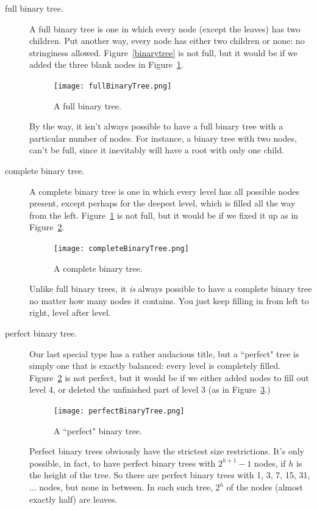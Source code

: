 \begin{description}
\item [full binary tree.] A full binary tree is one in which every node
(except the leaves) has two children. Put another way, every node has
either two children or none: no stringiness allowed.
Figure~\ref{binarytree} is not full, but it would be if we added the three
blank nodes in Figure~\ref{fullbinarytree}.

\begin{figure}[ht]
\centering
\texttt{[image: fullBinaryTree.png]}
\caption{A full binary tree.}
\label{fullbinarytree}
\end{figure}

By the way, it isn't always possible to have a full binary tree with a
particular number of nodes. For instance, a binary tree with two nodes,
can't be full, since it inevitably will have a root with only one child.

\item [complete binary tree.] A complete binary tree is one in which every
level has all possible nodes present, except perhaps for the deepest level,
which is filled all the way from the left. Figure~\ref{fullbinarytree} is
not full, but it would be if we fixed it up as in
Figure~\ref{completebinarytree}.

\begin{figure}[ht]
\centering
\texttt{[image: completeBinaryTree.png]}
\caption{A complete binary tree.}
\label{completebinarytree}
\end{figure}

Unlike full binary trees, it \textit{is} always possible to have a complete
binary tree no matter how many nodes it contains. You just keep filling in
from left to right, level after level.

\item [perfect binary tree.] Our last special type has a rather audacious
title, but a ``perfect" tree is simply one that is exactly balanced: every
level is completely filled. 
Figure~\ref{completebinarytree} is
not perfect, but it would be if we either added nodes to fill out level 4,
or deleted the unfinished part of level 3 (as in
Figure~\ref{perfectbinarytree}.)

\begin{figure}[ht]
\centering
\texttt{[image: perfectBinaryTree.png]}
\caption{A ``perfect" binary tree.}
\label{perfectbinarytree}
\end{figure}

Perfect binary trees obviously have the strictest size restrictions. It's
only possible, in fact, to have perfect binary trees with $2^{h+1}-1$
nodes, if $h$ is the height of the tree. So there are perfect binary trees
with 1, 3, 7, 15, 31, ... nodes, but none in between. In each such tree,
$2^h$ of the nodes (almost exactly half) are leaves.

\end{description}

